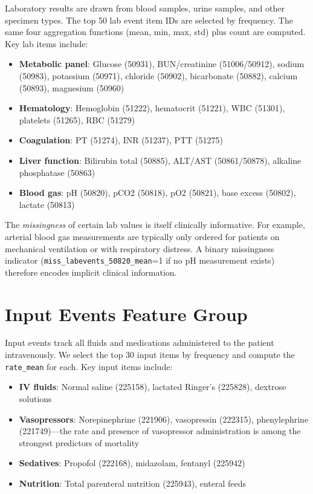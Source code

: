 \documentclass[11pt,a4paper]{report}
\begin{document}
Laboratory results are drawn from blood samples, urine samples, and other specimen types. The top 50 lab event item IDs are selected by frequency. The same four aggregation functions (mean, min, max, std) plus count are computed. Key lab items include:

\begin{itemize}[leftmargin=2em]
\item \textbf{Metabolic panel}: Glucose (50931), BUN/creatinine (51006/50912), sodium (50983), potassium (50971), chloride (50902), bicarbonate (50882), calcium (50893), magnesium (50960)
\item \textbf{Hematology}: Hemoglobin (51222), hematocrit (51221), WBC (51301), platelets (51265), RBC (51279)
\item \textbf{Coagulation}: PT (51274), INR (51237), PTT (51275)
\item \textbf{Liver function}: Bilirubin total (50885), ALT/AST (50861/50878), alkaline phosphatase (50863)
\item \textbf{Blood gas}: pH (50820), pCO2 (50818), pO2 (50821), base excess (50802), lactate (50813)
\end{itemize}

The \emph{missingness} of certain lab values is itself clinically informative. For example, arterial blood gas measurements are typically only ordered for patients on mechanical ventilation or with respiratory distress. A binary missingness indicator (\texttt{miss\_labevents\_50820\_mean}=1 if no pH measurement exists) therefore encodes implicit clinical information.

\section{Input Events Feature Group}

Input events track all fluids and medications administered to the patient intravenously. We select the top 30 input items by frequency and compute the \texttt{rate\_mean} for each. Key input items include:

\begin{itemize}[leftmargin=2em]
\item \textbf{IV fluids}: Normal saline (225158), lactated Ringer's (225828), dextrose solutions
\item \textbf{Vasopressors}: Norepinephrine (221906), vasopressin (222315), phenylephrine (221749)---the rate and presence of vasopressor administration is among the strongest predictors of mortality
\item \textbf{Sedatives}: Propofol (222168), midazolam, fentanyl (225942)
\item \textbf{Nutrition}: Total parenteral nutrition (225943), enteral feeds
\end{itemize}
\end{document}
